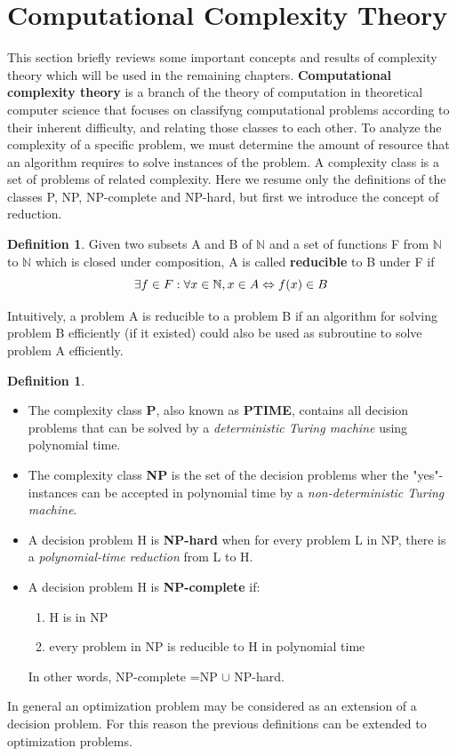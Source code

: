 \documentclass[
  twoside,
  11pt, a4paper,
  footinclude=true,
  headinclude=true,
  cleardoublepage=empty
]{book}
\theoremstyle{definition}
\newtheorem{definition}[theorem]{Definition}
\begin{document}
\section{Computational Complexity Theory}
This section briefly reviews some important concepts and results of complexity theory which will be used in the remaining chapters.
\textbf{Computational complexity theory} is a branch of the theory of computation in theoretical computer science that focuses on classifyng computational problems according to their inherent difficulty, and relating those classes to each other. \newline
To analyze the complexity of a specific problem, we must determine the amount of resource that an algorithm requires to solve instances of the problem. \newline
A complexity class is a set of problems of related complexity. Here we resume only the definitions of the classes P, NP, NP-complete and NP-hard, but first we introduce the concept of reduction.
\begin{definition} Given two subsets A and B of $\mathbb{N}$ and a set of functions F from $\mathbb{N}$ to $\mathbb{N}$ which is closed under composition, A is called \textbf{reducible} to B under F if
\begin{equation} \notag
\exists f \in F : \forall x \in \mathbb{N}, x \in A \Leftrightarrow f(x) \in B
\end{equation}
\end{definition}
Intuitively, a problem A is reducible to a problem B if an algorithm for solving problem B efficiently (if it existed) could also be used as subroutine to solve problem A efficiently.
\begin{definition} \begin{itemize}
\item The complexity class \textbf{P}, also known as \textbf{PTIME}, contains all decision problems that can be solved by a \emph{deterministic Turing machine} using polynomial time.
\item The complexity class \textbf{NP} is the set of the decision problems wher the "yes"-instances can be accepted in polynomial time by a \emph{non-deterministic Turing machine}.
\item A decision problem H is \textbf{NP-hard} when for every problem L in NP, there is a \emph{polynomial-time reduction} from L to H.
\item A decision problem H is \textbf{NP-complete} if:
\begin{enumerate}
\item H is in NP
\item every problem in NP is reducible to H in polynomial time
\end{enumerate}
In other words, NP-complete =NP $\cup$ NP-hard.
\end{itemize}
\end{definition}
In general an optimization problem may be considered as an extension of a decision problem. For this reason the previous definitions can be extended to optimization problems.
\end{document}
